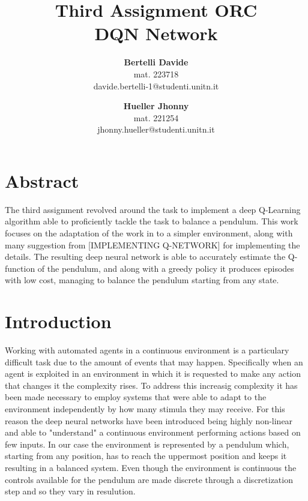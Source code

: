 \documentclass[twocolumn, a4paper]{article}
\begin{document}
\title{
	   \LARGE\textbf{Third Assignment ORC\\DQN Network}
	   \vspace{1cm}
	  }
\author{
		\textbf{Bertelli Davide} \\
		mat. 223718 \\
		davide.bertelli-1@studenti.unitn.it
		\and
		\textbf{Hueller Jhonny} \\
		mat. 221254\\
		jhonny.hueller@studenti.unitn.it
	   }
\date{}
\maketitle

\section{Abstract}
The third assignment revolved around the task to implement a deep Q-Learning
algorithm able to proficiently tackle the task to balance a pendulum.
This work focuses on the adaptation of the work in \cite{Mnih} to a simpler
environment, along with many suggestion from [IMPLEMENTING Q-NETWORK] for
implementing the details.
The resulting deep neural network is able to accurately estimate the Q-function
of the pendulum, and along with a greedy policy it produces episodes with
low cost, managing to balance the pendulum starting from any state.

\section{Introduction}
Working with automated agents in a continuous environment is a particulary
difficult task due to the amount of events that may happen. Specifically
when an agent is exploited in an environment in which it is requested to
make any action that changes it the complexity rises. To address this increasig
complexity it has been made necessary to employ systems that were able to
adapt to the environment independently by how many stimula they may receive.
For this reason the deep neural networks have been introduced being highly
non-linear and able to "understand" a continuous environment performing
actions based on few inputs.
In our case the environment is represented by a pendulum which, starting from
any position, has to reach the uppermost position and keeps it resulting in a
balanced system. Even though the environment is continuous the controls
available for the pendulum are made discrete through a discretization step
and so they vary in resulution.
\end{document}
